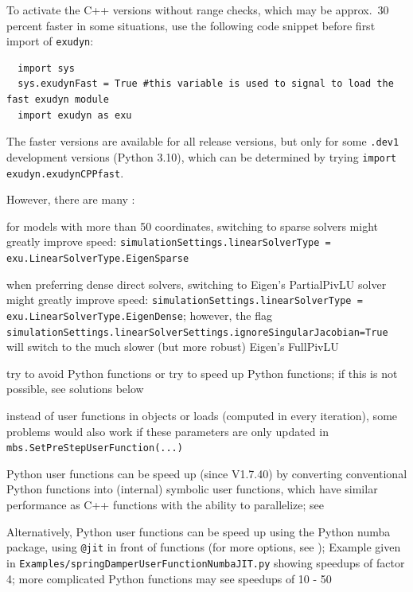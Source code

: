 To activate the \codeName C++ versions without range checks, which may be approx.\ 30 percent faster in some situations, use the following code snippet before first import of \texttt{exudyn}:
\pythonstyle\begin{lstlisting}
  import sys
  sys.exudynFast = True #this variable is used to signal to load the fast exudyn module
  import exudyn as exu
\end{lstlisting}
The faster versions are available for all release versions, but only for some \texttt{.dev1} development versions (Python 3.10), which can be determined by trying \texttt{import exudyn.exudynCPPfast}.

\noindent However, there are many :
\bi
  \item for models with more than 50 coordinates, switching to sparse solvers might greatly improve speed: \texttt{simulationSettings.linearSolverType = exu.LinearSolverType.EigenSparse}
  \item when preferring dense direct solvers, switching to Eigen's PartialPivLU solver might greatly improve speed: \texttt{simulationSettings.linearSolverType = exu.LinearSolverType.EigenDense}; however, the flag \texttt{simulationSettings.linearSolverSettings.ignoreSingularJacobian=True} will switch to the much slower (but more robust) Eigen's FullPivLU
  \item try to avoid Python functions or try to speed up Python functions; if this is not possible, see solutions below
  \item instead of user functions in objects or loads (computed in every iteration), some problems would also work if these parameters are only updated in \texttt{mbs.SetPreStepUserFunction(...)}
  \item Python user functions can be speed up (since \codeName V1.7.40) by converting conventional Python functions into \codeName (internal) symbolic user functions, which have similar performance as C++ functions with the ability to parallelize; see 
  \item Alternatively, Python user functions can be speed up using the Python numba package, using \texttt{@jit} in front of functions (for more options, see ); Example given in \texttt{Examples/springDamperUserFunctionNumbaJIT.py} showing speedups of factor 4; more complicated Python functions may see speedups of 10 - 50

